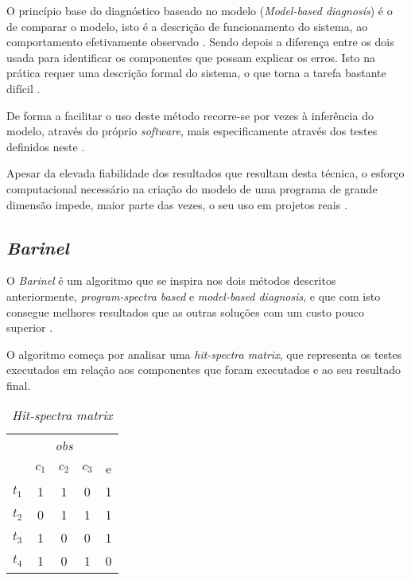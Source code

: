 O princípio base do diagnóstico baseado no modelo (\emph{Model-based diagnosís}) é o de comparar o modelo, isto é a descrição de funcionamento do sistema, ao comportamento efetivamente observado \cite{Mayer2008}. Sendo depois a diferença entre os dois usada para identificar os componentes que possam explicar os erros. Isto na prática requer uma descrição formal do sistema, o que torna a tarefa bastante difícil \cite{Perez2004}.

De forma a facilitar o uso deste método recorre-se por vezes à inferência do modelo, através do próprio \emph{software}, mais especificamente através dos testes definidos neste \cite{Perez2004}.

Apesar da elevada fiabilidade dos resultados que resultam desta técnica, o esforço computacional necessário na criação do modelo de uma programa de grande dimensão impede, maior parte das vezes, o seu uso em projetos reais \cite{Mayer2008}.

% 
%

\subsection{\emph{Barinel}}

O \emph{Barinel} é um algoritmo que se inspira nos dois métodos descritos anteriormente, \emph{program-spectra based} e \emph{model-based diagnosis}, e que com isto consegue melhores resultados que as outras soluções com um custo pouco superior \cite{Abreu2009}.

O algoritmo começa por analisar uma \emph{hit-spectra matrix}, que representa os testes executados em relação aos componentes que foram executados e ao seu resultado final.

\begin{table}[H]
	\centering
	\begin{tabular}{c|ccc|c} 
		& \multicolumn{3}{c|}{\textit{obs}} &  \\
		& $c_1$ & $c_2$ & $c_3$ & e \\ 
	 	\hline
		$t_1$ & 1 & 1 & 0 & 1 \\
		$t_2$ & 0 & 1 & 1 & 1 \\
		$t_3$ & 1 & 0 & 0 & 1 \\
		$t_4$ & 1 & 0 & 1 & 0 \\
	\end{tabular}
	\caption{\emph{Hit-spectra matrix}}
	\label{tab:hit-spectra}
\end{table}


